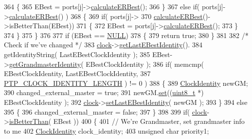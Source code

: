 \begin{DoxyCode}
364         \{
365             EBest = ports[j]->\hyperlink{class_common_port_a6951410ed8e6a5ef44a028ef0a50cdeb}{calculateERBest}();
366         \}
367         \textcolor{keywordflow}{else} \textcolor{keywordflow}{if}( ports[j]->\hyperlink{class_common_port_a6951410ed8e6a5ef44a028ef0a50cdeb}{calculateERBest}() )
368         \{
369             \textcolor{keywordflow}{if}( ports[j]->
370                 \hyperlink{class_common_port_a6951410ed8e6a5ef44a028ef0a50cdeb}{calculateERBest}()->isBetterThan(EBest))
371             \{
372                 EBest = ports[j]->\hyperlink{class_common_port_a6951410ed8e6a5ef44a028ef0a50cdeb}{calculateERBest}();
373             \}
374         \}
375     \}
376 
377     \textcolor{keywordflow}{if} (EBest == \hyperlink{openavb__types__base__pub_8h_a070d2ce7b6bb7e5c05602aa8c308d0c4}{NULL})
378     \{
379         \textcolor{keywordflow}{return} \textcolor{keyword}{true};
380     \}
381 
382     \textcolor{comment}{/* Check if we've changed */}
383     \hyperlink{class_common_port_aa2bc8731fa5aeb5b033feebc2b67258c}{clock}->\hyperlink{class_i_e_e_e1588_clock_ac49f35801b6e22547682034e47b02c90}{getLastEBestIdentity}().
384         getIdentityString( LastEBestClockIdentity );
385     EBest->\hyperlink{class_p_t_p_message_announce_a8c30dedc349082deec06da1c0691f500}{getGrandmasterIdentity}( EBestClockIdentity );
386     \textcolor{keywordflow}{if}( memcmp( EBestClockIdentity, LastEBestClockIdentity,
387             \hyperlink{ptptypes_8hpp_afd1566058ed7927c2b790c9d4a0051ec}{PTP\_CLOCK\_IDENTITY\_LENGTH} ) != 0 )
388     \{
389         \hyperlink{class_clock_identity}{ClockIdentity} newGM;
390         changed\_external\_master = \textcolor{keyword}{true};
391         newGM.\hyperlink{class_clock_identity_ab72d8e8d5a8c02e4c3a3ddcb272e7f4c}{set}((\hyperlink{stdint_8h_aba7bc1797add20fe3efdf37ced1182c5}{uint8\_t} *) EBestClockIdentity );
392         \hyperlink{class_common_port_aa2bc8731fa5aeb5b033feebc2b67258c}{clock}->\hyperlink{class_i_e_e_e1588_clock_a92b9d40586b473e0538333eb446f05f9}{setLastEBestIdentity}( newGM );
393     \}
394     \textcolor{keywordflow}{else}
395     \{
396         changed\_external\_master = \textcolor{keyword}{false};
397     \}
398 
399     \textcolor{keywordflow}{if}( \hyperlink{class_common_port_aa2bc8731fa5aeb5b033feebc2b67258c}{clock}->\hyperlink{class_i_e_e_e1588_clock_a3bf4e41c1ccf46f20b2330330bd69630}{isBetterThan}( EBest ))
400     \{
401         \textcolor{comment}{// We're Grandmaster, set grandmaster info to me}
402         \hyperlink{class_clock_identity}{ClockIdentity} clock\_identity;
403         \textcolor{keywordtype}{unsigned} \textcolor{keywordtype}{char} priority1;

\end{DoxyCode}
